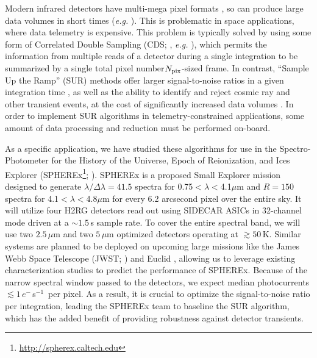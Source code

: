 \documentclass{ws-jai}
\newcommand{\eps}{$e^{-} \,$s$^{-1}$}
\begin{document}
Modern infrared detectors have multi-mega pixel formats
\citep{Beletic2008}, so can produce large data volumes in short times
(\textit{e.g.} \citealt{Smith2012}).  This is problematic in space
applications, where data telemetry is expensive.  This problem is
typically solved by using some form of Correlated Double Sampling
(CDS; \citealt{Fowler1990}, \textit{e.g.}  \citealt{Robberto2007}),
which permits the information from multiple reads of a detector during
a single integration to be summarized by a single total pixel
number$N_{\rm pix}$-sized frame.  In contrast, ``Sample Up the Ramp''
(SUR) methods offer larger signal-to-noise ratios in a given
integration time \citep{Garnett1993}, as well as the ability to
identify and reject cosmic ray and other transient events, at the cost
of significantly increased data volumes \citep{Rauscher2007}.  In
order to implement SUR algorithms in telemetry-constrained
applications, some amount of data processing and reduction must be
performed on-board.

As a specific application, we have studied these algorithms for use in
the Spectro-Photometer for the History of the Universe, Epoch of
Reionization, and Ices Explorer
(SPHEREx\footnote{\url{http://spherex.caltech.edu}};
\citealt{Dore2014}).  SPHEREx is a proposed Small Explorer mission
designed to generate $\lambda/\Delta \lambda=41.5$ spectra for
0.75$<\lambda<$4.1$\mu$m and $R=150$ spectra for
4.1$<\lambda<$4.8$\mu$m for every 6.2 arcsecond pixel over the entire
sky.  It will utilize four H2RG detectors read out using SIDECAR ASICs
\citep{Loose2006} in 32-channel mode driven at a $\sim 1.5 \,$s sample
rate.  To cover the entire spectral band, we will use two
$2.5 \, \mu$m and two $5 \, \mu$m optimized detectors operating at
$\gtrsim 50 \,$K.  Similar systems are planned to be deployed on
upcoming large missions like the James Webb Space Telescope (JWST;
\citealt{Rauscher2007}) and Euclid \citep{Crouzet2012}, allowing us to
leverage existing characterization studies to predict the performance
of SPHEREx.  Because of the narrow spectral window passed to the
detectors, we expect median photocurrents $\lesssim 1 \,$\eps\ per
pixel.  As a result, it is crucial to optimize the signal-to-noise
ratio per integration, leading the SPHEREx team to baseline the SUR
algorithm, which has the added benefit of providing robustness against
detector transients.
\end{document}
